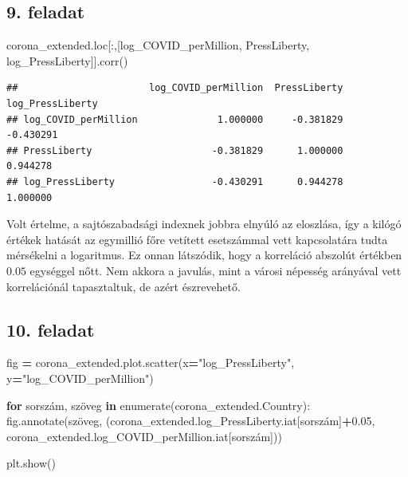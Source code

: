 \documentclass[
]{book}
\newenvironment{Shaded}{\begin{snugshade}}{\end{snugshade}}
\newcommand{\BuiltInTok}[1]{#1}
\newcommand{\ControlFlowTok}[1]{\textcolor[rgb]{0.13,0.29,0.53}{\textbf{#1}}}
\newcommand{\FloatTok}[1]{\textcolor[rgb]{0.00,0.00,0.81}{#1}}
\newcommand{\KeywordTok}[1]{\textcolor[rgb]{0.13,0.29,0.53}{\textbf{#1}}}
\newcommand{\NormalTok}[1]{#1}
\newcommand{\OperatorTok}[1]{\textcolor[rgb]{0.81,0.36,0.00}{\textbf{#1}}}
\newcommand{\StringTok}[1]{\textcolor[rgb]{0.31,0.60,0.02}{#1}}
\begin{document}
\subsection*{9. feladat}\label{feladat-8}

\begin{Shaded}
\begin{Highlighting}[]
\NormalTok{corona\_extended.loc[:,[}\StringTok{\textquotesingle{}log\_COVID\_perMillion\textquotesingle{}}\NormalTok{, }\StringTok{\textquotesingle{}PressLiberty\textquotesingle{}}\NormalTok{, }\StringTok{\textquotesingle{}log\_PressLiberty\textquotesingle{}}\NormalTok{]].corr()}
\end{Highlighting}
\end{Shaded}

\begin{verbatim}
##                       log_COVID_perMillion  PressLiberty  log_PressLiberty
## log_COVID_perMillion              1.000000     -0.381829         -0.430291
## PressLiberty                     -0.381829      1.000000          0.944278
## log_PressLiberty                 -0.430291      0.944278          1.000000
\end{verbatim}

Volt értelme, a sajtószabadsági indexnek jobbra elnyúló az eloszlása, így a kilógó értékek hatását az egymillió főre vetített esetszámmal vett kapcsolatára tudta mérsékelni a logaritmus. Ez onnan látszódik, hogy a korreláció abszolút értékben \(0.05\) egységgel nőtt. Nem akkora a javulás, mint a városi népesség arányával vett korrelációnál tapasztaltuk, de azért észrevehető.

\subsection*{10. feladat}\label{feladat-9}

\begin{Shaded}
\begin{Highlighting}[]
\NormalTok{fig }\OperatorTok{=}\NormalTok{ corona\_extended.plot.scatter(x}\OperatorTok{=}\StringTok{"log\_PressLiberty"}\NormalTok{, y}\OperatorTok{=}\StringTok{"log\_COVID\_perMillion"}\NormalTok{)}

\ControlFlowTok{for}\NormalTok{ sorszám, szöveg }\KeywordTok{in} \BuiltInTok{enumerate}\NormalTok{(corona\_extended.Country):}
\NormalTok{   fig.annotate(szöveg, (corona\_extended.log\_PressLiberty.iat[sorszám]}\OperatorTok{+}\FloatTok{0.05}\NormalTok{, corona\_extended.log\_COVID\_perMillion.iat[sorszám]))}

\NormalTok{plt.show()}
\end{Highlighting}
\end{Shaded}
\end{document}
